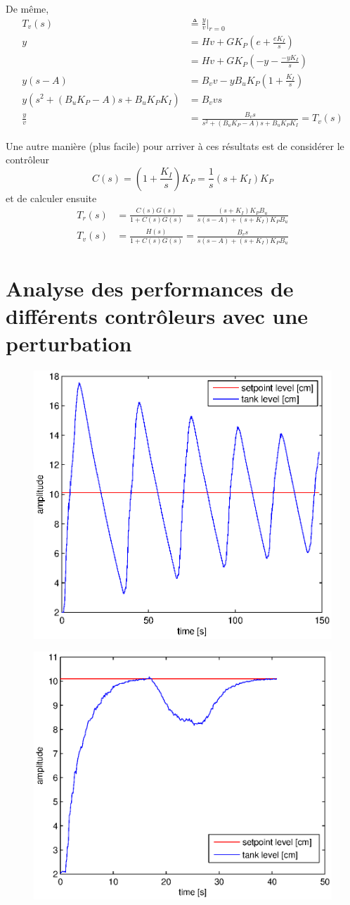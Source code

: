 \documentclass[frenchb, paper=a4, fontsize=11pt]{scrartcl}
\numberwithin{equation}{section}					%
\numberwithin{figure}{section}					%
\numberwithin{table}{section}						%
\begin{document}
De même,
\begin{align}
T_v(s) & \triangleq \frac{y}{v}\rvert_{r=0}\\
y &= H v+ G K_P (e+\frac{eK_I}{s})\\
&= H v + G K_P(-y-\frac{-yK_I}{s}) \\
y(s-A) &= B_v v - y B_u K_P (1+\frac{K_I}{s})\\
y(s^2 + (B_u K_P-A)s + B_u K_P K_I) &= B_v v s\\
\frac{y}{v} & = \frac{B_v s}{s^2 + (B_u K_P-A)s + B_u K_P K_I} = T_v(s)
\end{align}

Une autre manière (plus facile) pour arriver à ces résultats est de considérer le contrôleur 
\begin{equation}
C(s) = (1+\frac{K_I}{s})K_P = \frac{1}{s}(s+K_I)K_P
\end{equation}
et de calculer ensuite
\begin{align}
T_r(s) &= \frac{C(s)G(s)}{1+C(s)G(s)} = \frac{(s+K_I)K_P B_u}{s(s-A)+(s+K_I)K_P B_u}\\
T_v(s) &= \frac{H(s)}{1+C(s)G(s)} = \frac{B_v s}{s(s-A)+(s+K_I)K_P B_u}
\end{align}

\section{Analyse des performances de différents contrôleurs avec une perturbation}

\begin{figure}
\centering
\begin{minipage}{.5\textwidth}
  \centering
  \includegraphics[width=.4\linewidth]{img/cl-2_5-2.eps}
  \label{fig:test1}
\end{minipage}%
\begin{minipage}{.5\textwidth}
  \centering
  \includegraphics[width=.4\linewidth]{img/cl-10-0.eps}
  \label{fig:test2}
\end{minipage}
\end{figure}
\end{document}
